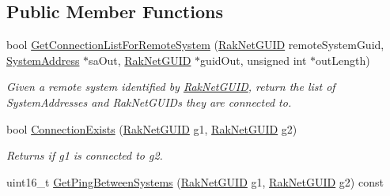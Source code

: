 \subsection*{Public Member Functions}
\begin{DoxyCompactItemize}
\item 
bool \hyperlink{class_rak_net_1_1_connection_graph2_a4806ed13f28469618cffbff3bf3459a1}{Get\-Connection\-List\-For\-Remote\-System} (\hyperlink{struct_rak_net_1_1_rak_net_g_u_i_d}{Rak\-Net\-G\-U\-I\-D} remote\-System\-Guid, \hyperlink{struct_rak_net_1_1_system_address}{System\-Address} $\ast$sa\-Out, \hyperlink{struct_rak_net_1_1_rak_net_g_u_i_d}{Rak\-Net\-G\-U\-I\-D} $\ast$guid\-Out, unsigned int $\ast$out\-Length)
\begin{DoxyCompactList}\small\item\em Given a remote system identified by \hyperlink{struct_rak_net_1_1_rak_net_g_u_i_d}{Rak\-Net\-G\-U\-I\-D}, return the list of System\-Addresses and Rak\-Net\-G\-U\-I\-Ds they are connected to. \end{DoxyCompactList}\item 
\hypertarget{class_rak_net_1_1_connection_graph2_a19de5fac28b1ae358999e0d9789385ac}{bool \hyperlink{class_rak_net_1_1_connection_graph2_a19de5fac28b1ae358999e0d9789385ac}{Connection\-Exists} (\hyperlink{struct_rak_net_1_1_rak_net_g_u_i_d}{Rak\-Net\-G\-U\-I\-D} g1, \hyperlink{struct_rak_net_1_1_rak_net_g_u_i_d}{Rak\-Net\-G\-U\-I\-D} g2)}\label{class_rak_net_1_1_connection_graph2_a19de5fac28b1ae358999e0d9789385ac}

\begin{DoxyCompactList}\small\item\em Returns if g1 is connected to g2. \end{DoxyCompactList}\item 
\hypertarget{class_rak_net_1_1_connection_graph2_a51aa05cce39f5d2788907276e5fb7bc4}{uint16\-\_\-t \hyperlink{class_rak_net_1_1_connection_graph2_a51aa05cce39f5d2788907276e5fb7bc4}{Get\-Ping\-Between\-Systems} (\hyperlink{struct_rak_net_1_1_rak_net_g_u_i_d}{Rak\-Net\-G\-U\-I\-D} g1, \hyperlink{struct_rak_net_1_1_rak_net_g_u_i_d}{Rak\-Net\-G\-U\-I\-D} g2) const }\label{class_rak_net_1_1_connection_graph2_a51aa05cce39f5d2788907276e5fb7bc4}


\end{DoxyCompactItemize}
